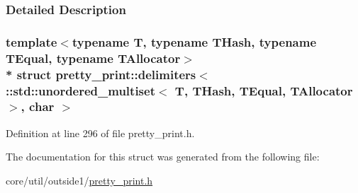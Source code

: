 \subsubsection{Detailed Description}
\subsubsection*{template$<$typename T, typename T\+Hash, typename T\+Equal, typename T\+Allocator$>$\\*
struct pretty\+\_\+print\+::delimiters$<$ \+::std\+::unordered\+\_\+multiset$<$ T, T\+Hash, T\+Equal, T\+Allocator $>$, char $>$}



Definition at line 296 of file pretty\+\_\+print.\+h.



The documentation for this struct was generated from the following file\+:\begin{DoxyCompactItemize}
\item 
core/util/outside1/\hyperlink{pretty__print_8h}{pretty\+\_\+print.\+h}\end{DoxyCompactItemize}
